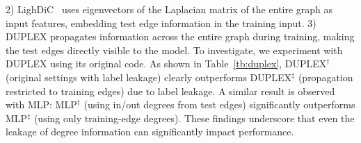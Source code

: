 2) LighDiC~\cite{lightdic} uses eigenvectors of the Laplacian matrix of the entire graph as input features, embedding test edge information in the training input. 
3) DUPLEX propagates information across the entire graph during training, making the test edges directly visible to the model. %
To investigate, we experiment with DUPLEX using its original code. As shown in Table~\ref{tb:duplex}, DUPLEX$^\dagger$ (original settings with label leakage) clearly outperforms DUPLEX$^\ddagger$ (propagation restricted to training edges) due to label leakage. A similar result is observed with MLP: MLP$^\dagger$ (using in/out degrees from test edges) significantly outperforms MLP$^\ddagger$ (using only training-edge degrees). These findings underscore that even the leakage of degree information can significantly impact performance.



